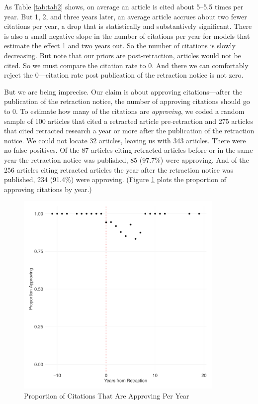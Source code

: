 \documentclass[12pt, letterpaper]{article}
\begin{document}
As Table \ref{tab:tab2} shows, on average an article is cited about 5--5.5 times per year. But 1, 2, and three years later, an average article accrues about two fewer citations per year, a drop that is statistically and substantively significant. There is also a small negative slope in the number of citations per year for models that estimate the effect 1 and two years out. So the number of citations is slowly decreasing. But note that our priors are post-retraction, articles would not be cited. So we must compare the citation rate to 0. And there we can comfortably reject the 0---citation rate post publication of the retraction notice is not zero.  

But we are being imprecise. Our claim is about approving citations---after the publication of the retraction notice, the number of approving citations should go to 0. To estimate how many of the citations are \textit{approving}, we coded a random sample of 100 articles that cited a retracted article pre-retraction and 275 articles that cited retracted research a year or more after the publication of the retraction notice. We could not locate 32 articles, leaving us with 343 articles. There were no false positives. Of the 87 articles citing retracted articles before or in the same year the retraction notice was published, 85 (97.7\%) were approving. And of the 256 articles citing retracted articles the year after the retraction notice was published, 234 (91.4\%) were approving. (Figure \ref{fig:prop_approving_per_year} plots the proportion of approving citations by year.) 

\begin{figure}
\centering
\includegraphics[width=10cm]{../figs/pre_post_prop_approving.pdf}
\caption{Proportion of Citations That Are Approving Per Year}
\label{fig:prop_approving_per_year}
\end{figure}
\end{document}

